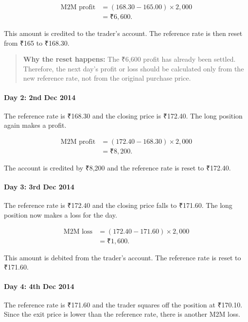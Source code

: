 \documentclass[12pt,openany]{book}
\begin{document}
\begin{align*}
\text{M2M profit} &= (168.30 - 165.00) \times 2{,}000 \\
&= \text{₹}6{,}600.
\end{align*}

This amount is credited to the trader's account. The reference rate is then reset from ₹165 to ₹168.30.

\begin{quote}
\textbf{Why the reset happens:} The ₹6,600 profit has already been settled. Therefore, the next day's profit or loss should be calculated only from the new reference rate, not from the original purchase price.
\end{quote}

\paragraph{Day 2: 2nd Dec 2014}
The reference rate is ₹168.30 and the closing price is ₹172.40. The long position again makes a profit.

\begin{align*}
\text{M2M profit} &= (172.40 - 168.30) \times 2{,}000 \\
&= \text{₹}8{,}200.
\end{align*}

The account is credited by ₹8,200 and the reference rate is reset to ₹172.40.

\paragraph{Day 3: 3rd Dec 2014}
The reference rate is ₹172.40 and the closing price falls to ₹171.60. The long position now makes a loss for the day.

\begin{align*}
\text{M2M loss} &= (172.40 - 171.60) \times 2{,}000 \\
&= \text{₹}1{,}600.
\end{align*}

This amount is debited from the trader's account. The reference rate is reset to ₹171.60.

\paragraph{Day 4: 4th Dec 2014}
The reference rate is ₹171.60 and the trader squares off the position at ₹170.10. Since the exit price is lower than the reference rate, there is another M2M loss.
\end{document}
